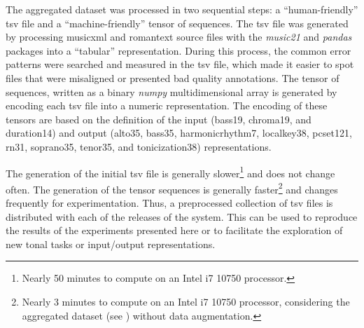 
The aggregated dataset was processed in two sequential
steps: a ``human-friendly'' \gls{tsv} file and a
``machine-friendly'' tensor of sequences. The \gls{tsv} file
was generated by processing \gls{musicxml} and
\gls{romantext} source files with the \emph{music21}
\parencite{cuthbert2010music21} and \emph{pandas}
\parencite{mckinney2011pandas} packages into a ``tabular''
representation. During this process, the common error
patterns were searched and measured in the \gls{tsv} file,
which made it easier to spot files that were misaligned or
presented bad quality annotations. The tensor of sequences,
written as a binary \emph{numpy}
\parencite{oliphant2006guide} multidimensional array is
generated by encoding each \gls{tsv} file into a numeric
representation. The encoding of these tensors are based on
the definition of the input (\gls{bass19}, \gls{chroma19},
and \gls{duration14}) and output (\gls{alto35},
\gls{bass35}, \gls{harmonicrhythm7}, \gls{localkey38},
\gls{pcset121}, \gls{rn31}, \gls{soprano35}, \gls{tenor35},
and \gls{tonicization38}) representations.

The generation of the initial \gls{tsv} file is generally
slower\footnote{Nearly 50 minutes to compute on an Intel i7
10750 processor.} and does not change often. The generation
of the tensor sequences is generally faster\footnote{Nearly
3 minutes to compute on an Intel i7 10750 processor,
considering the aggregated dataset (see
) without data augmentation.}
and changes frequently for experimentation. Thus, a
preprocessed collection of \gls{tsv} files is distributed
with each of the releases of the system. This can be used to
reproduce the results of the experiments presented here or
to facilitate the exploration of new tonal tasks or
input/output representations.
